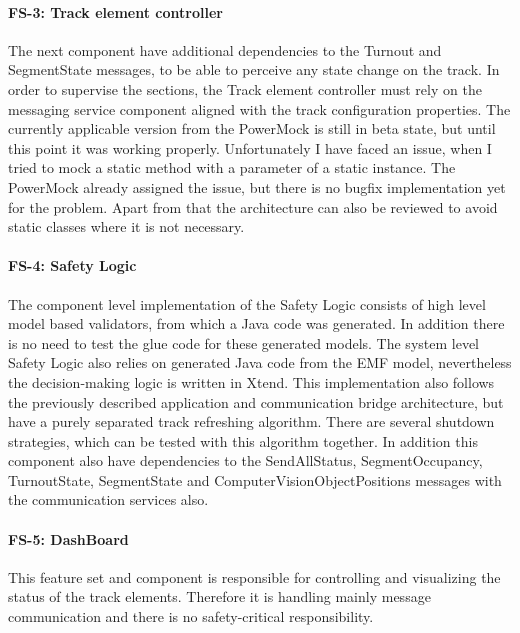 \paragraph{FS-3: Track element controller} The next component have additional dependencies to the Turnout and SegmentState messages, to be able to perceive any state change on the track. In order to supervise the sections, the Track element controller must rely on the messaging service component aligned with the track configuration properties. The currently applicable version from the PowerMock is still in beta state, but until this point it was working properly. Unfortunately I have faced an issue, when I tried to mock a static method with a parameter of a static instance. The PowerMock already assigned the issue, but there is no bugfix implementation yet for the problem. Apart from that the architecture can also be reviewed to avoid static classes where it is not necessary.

\paragraph{FS-4: Safety Logic} The component level implementation of the Safety Logic consists of high level model based validators, from which a Java code was generated. In addition there is no need to test the glue code for these generated models. The system level Safety Logic also relies on generated Java code from the EMF model, nevertheless the decision-making logic is written in Xtend. This implementation also follows the previously described application and communication bridge architecture, but have a purely separated track refreshing algorithm. There are several shutdown strategies, which can be tested with this algorithm together. In addition this component also have dependencies to the SendAllStatus, SegmentOccupancy, TurnoutState, SegmentState and ComputerVisionObjectPositions messages with the communication services also.

\paragraph{FS-5: DashBoard} This feature set and component is responsible for controlling and visualizing the status of the track elements. Therefore it is handling mainly message communication and there is no safety-critical responsibility.

